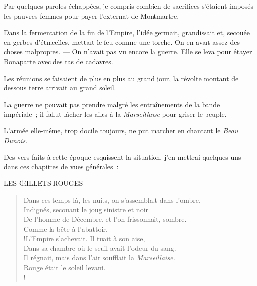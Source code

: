 \documentclass[french,twoside]{book} %
\newenvironment{quoteblock}%
  {\begin{quoting}}
  {\end{quoting}}
\newenvironment{quotebar}{%
    \def\FrameCommand{{\color{rubric!10!}\vrule width 0.5em} \hspace{0.9em}}%
    \def\OuterFrameSep{\itemsep} %
    \MakeFramed {\advance\hsize-\width \FrameRestore}
  }%
  {%
    \endMakeFramed
  }
\renewenvironment{quoteblock}%
  {%
    \savenotes
    \setstretch{0.9}
    \normalfont
    \begin{quotebar}
  }
  {%
    \end{quotebar}
    \spewnotes
  }
\begin{document}
Par quelques paroles échappées, je compris combien de sacrifices s’étaient imposés les pauvres femmes pour payer l’externat de Montmartre.\par
Dans la fermentation de la fin de l’Empire,  l’idée germait, grandissait et, secouée en gerbes d’étincelles, mettait le feu comme une torche. On en avait assez des choses malpropres. — On n’avait pas vu encore la guerre. Elle se leva pour étayer Bonaparte avec des tas de cadavres.\par
Les réunions se faisaient de plus en plus au grand jour, la révolte montant de dessous terre arrivait au grand soleil.\par
La guerre ne pouvait pas prendre malgré les entraînements de la bande impériale ; il fallut lâcher les ailes à la \emph{Marseillaise} pour griser le peuple.\par
L’armée elle-même, trop docile toujours, ne put marcher en chantant le \emph{Beau Dunois}.\par
Des vers faits à cette époque esquissent la situation, j’en mettrai quelques-uns dans ces chapitres de vues générales :\par

\begin{quoteblock}
LES ŒILLETS ROUGES\end{quoteblock}

\begin{verse}
Dans ces temps-là, les nuits, on s’assemblait dans l’ombre,\\
Indignés, secouant le joug sinistre et noir\\
De l’homme de Décembre, et l’on frissonnait, sombre.\\
\hspace{1em}\hspace{1em}Comme la bête à l’abattoir.\\!L’Empire s’achevait. Il tuait à son aise,\\
Dans sa chambre où le seuil avait l’odeur du sang.\\
Il régnait, mais dans l’air soufflait la \emph{Marseillaise.}\\
\hspace{1em}\hspace{1em}Rouge était le soleil levant.\\!
\end{verse}
\begin{quoteblock}
 \end{quoteblock}
\end{document}
